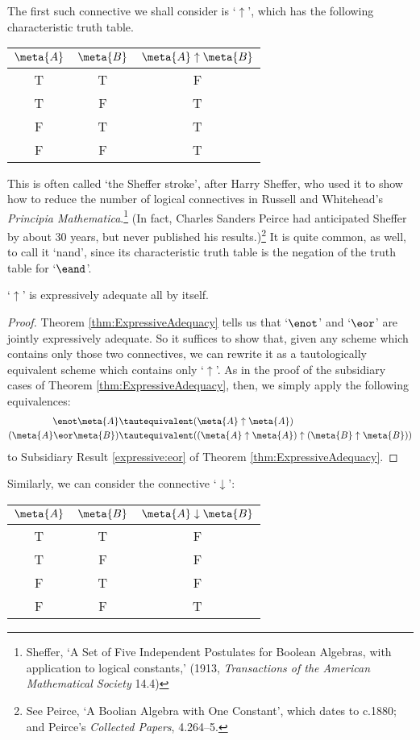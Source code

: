The first such connective we shall consider is `$\uparrow$', which has the following characteristic truth table. 
\begin{center}
\begin{tabular}{c c | c}
$\meta{A}$ & $\meta{B}$ & $\meta{A} \mathrel{\uparrow} \meta{B}$\\
\hline
 T & T & F \\
 T & F & T \\
 F & T & T  \\
 F & F & T
\end{tabular}
\end{center}
 This is often called `the Sheffer stroke', after Harry Sheffer, who used it to show how to reduce the number of logical connectives in Russell and Whitehead's \emph{Principia Mathematica}.\footnote{Sheffer, `A Set of Five Independent Postulates for Boolean Algebras, with application to logical constants,' (1913, \emph{Transactions of the American Mathematical Society} 14.4)} (In fact, Charles Sanders Peirce had anticipated Sheffer by about 30 years, but never published his results.)\footnote{See Peirce, `A Boolian Algebra with One Constant', which dates to c.1880; and Peirce's \emph{Collected Papers}, 4.264--5.} It is quite common, as well, to call it `nand', since its characteristic truth table is the negation of the truth table for `$\eand$'.
\begin{prop}\label{prop:upexpressive}`$\uparrow$' is expressively adequate all by itself. 
	\begin{proof}
		Theorem \ref{thm:ExpressiveAdequacy} tells us that `$\enot$' and `$\eor$' are jointly expressively adequate. So it suffices to show that, given any scheme which contains only those two connectives, we can rewrite it as a tautologically equivalent scheme which contains only `$\uparrow$'. As in the proof of the subsidiary cases of Theorem \ref{thm:ExpressiveAdequacy}, then, we simply apply the following equivalences:
		\begin{align*}
			\enot \meta{A} &\tautequivalent (\meta{A} \uparrow \meta{A})\\
			(\meta{A} \eor \meta{B}) & \tautequivalent ((\meta{A} \uparrow \meta{A}) \uparrow (\meta{B} \uparrow \meta{B}))
		\end{align*}
		 to Subsidiary Result \ref{expressive:eor} of Theorem \ref{thm:ExpressiveAdequacy}.
	\end{proof}
\end{prop}\noindent
Similarly, we can consider the connective `$\downarrow$':
\begin{center}
\begin{tabular}{c c | c}
$\meta{A}$ & $\meta{B}$ & $\meta{A} \mathrel{\downarrow} \meta{B}$\\
\hline
 T & T & F \\
 T & F & F  \\
 F & T & F  \\
 F & F & T
\end{tabular}
\end{center}
